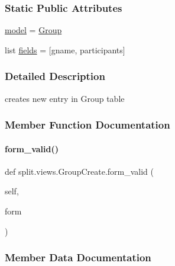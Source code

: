 \subsubsection*{Static Public Attributes}
\begin{DoxyCompactItemize}
\item 
\hyperlink{classsplit_1_1views_1_1GroupCreate_a92b8d00f9894e5ae0122a8d14430573d}{model} = \hyperlink{classsplit_1_1models_1_1Group}{Group}
\item 
list \hyperlink{classsplit_1_1views_1_1GroupCreate_a866511c2088dad69e98e01a88caf3761}{fields} = \mbox{[}\textquotesingle{}gname\textquotesingle{}, \textquotesingle{}participants\textquotesingle{}\mbox{]}
\end{DoxyCompactItemize}


\subsubsection{Detailed Description}
creates new entry in Group table 

\subsubsection{Member Function Documentation}
\mbox{\label{classsplit_1_1views_1_1GroupCreate_a51d45719401432233422c7944d45f942}} 
\paragraph{\texorpdfstring{form\+\_\+valid()}{form\_valid()}}
{\footnotesize\ttfamily def split.\+views.\+Group\+Create.\+form\+\_\+valid (\begin{DoxyParamCaption}\item[{}]{self,  }\item[{}]{form }\end{DoxyParamCaption})}



\subsubsection{Member Data Documentation}
\mbox{\label{classsplit_1_1views_1_1GroupCreate_a866511c2088dad69e98e01a88caf3761}} 
